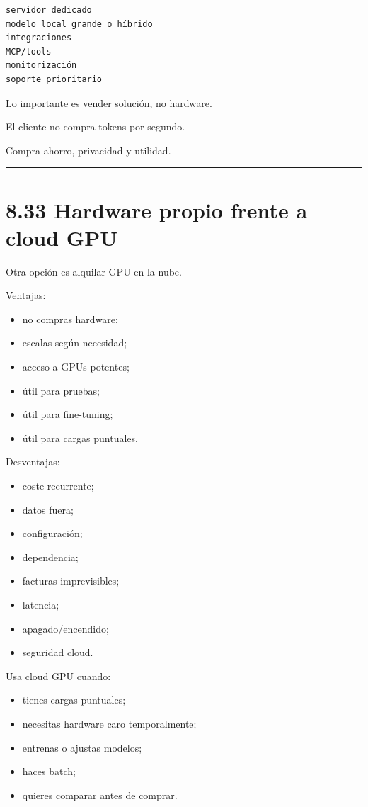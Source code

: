 \begin{lstlisting}
servidor dedicado
modelo local grande o híbrido
integraciones
MCP/tools
monitorización
soporte prioritario
\end{lstlisting}

Lo importante es vender solución, no hardware.

El cliente no compra tokens por segundo.

Compra ahorro, privacidad y utilidad.

\begin{center}\rule{0.5\linewidth}{0.5pt}\end{center}

\section{8.33 Hardware propio frente a cloud
GPU}\label{hardware-propio-frente-a-cloud-gpu}

Otra opción es alquilar GPU en la nube.

Ventajas:

\begin{itemize}
\tightlist
\item
  no compras hardware;
\item
  escalas según necesidad;
\item
  acceso a GPUs potentes;
\item
  útil para pruebas;
\item
  útil para fine-tuning;
\item
  útil para cargas puntuales.
\end{itemize}

Desventajas:

\begin{itemize}
\tightlist
\item
  coste recurrente;
\item
  datos fuera;
\item
  configuración;
\item
  dependencia;
\item
  facturas imprevisibles;
\item
  latencia;
\item
  apagado/encendido;
\item
  seguridad cloud.
\end{itemize}

Usa cloud GPU cuando:

\begin{itemize}
\tightlist
\item
  tienes cargas puntuales;
\item
  necesitas hardware caro temporalmente;
\item
  entrenas o ajustas modelos;
\item
  haces batch;
\item
  quieres comparar antes de comprar.
\end{itemize}

